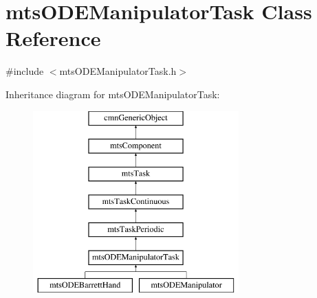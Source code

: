 \hypertarget{classmts_o_d_e_manipulator_task}{}\section{mts\+O\+D\+E\+Manipulator\+Task Class Reference}
\label{classmts_o_d_e_manipulator_task}


{\ttfamily \#include $<$mts\+O\+D\+E\+Manipulator\+Task.\+h$>$}

Inheritance diagram for mts\+O\+D\+E\+Manipulator\+Task\+:\begin{figure}[H]
\begin{center}
\leavevmode
\includegraphics[height=7.000000cm]{d7/d85/classmts_o_d_e_manipulator_task}
\end{center}
\end{figure}
